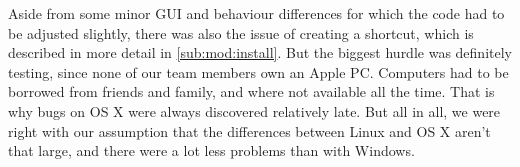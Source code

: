 Aside from some minor GUI and behaviour differences for which the code had to be adjusted slightly, there was also the issue of creating a shortcut, which is described in more detail in \cref{sub:mod:install}. But the biggest hurdle was definitely testing, since none of our team members own an Apple PC. Computers had to be borrowed from friends and family, and where not available all the time. That is why bugs on OS X were always discovered relatively late. But all in all, we were right with our assumption that the differences between Linux and OS X aren't that large, and there were a lot less problems than with Windows.